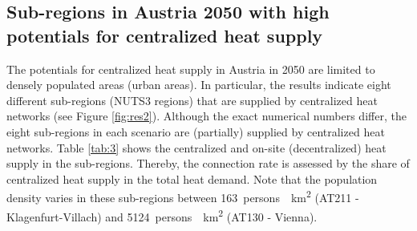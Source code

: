\subsection{Sub-regions in Austria 2050 with high potentials for centralized heat supply}\label{res:3}
The potentials for centralized heat supply in Austria in 2050 are limited to densely populated areas (urban areas). In particular, the results indicate eight different sub-regions (NUTS3 regions) that are supplied by centralized heat networks (see Figure \ref{fig:res2}). Although the exact numerical numbers differ, the eight sub-regions in each scenario are (partially) supplied by centralized heat networks. Table \ref{tab:3} shows the centralized and on-site (decentralized) heat supply in the sub-regions. Thereby, the connection rate is assessed by the share of centralized heat supply in the total heat demand. Note that the population density varies in these sub-regions between \SI{163}{persons \per \kilo\metre^2} (AT211 - Klagenfurt-Villach) and \SI{5124}{persons \per \kilo\metre^2} (AT130 - Vienna).

